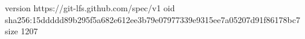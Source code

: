 version https://git-lfs.github.com/spec/v1
oid sha256:15ddddd89b295f5a682e612ee3b79e07977339e9315ee7a05207d91f86178bc7
size 1207

